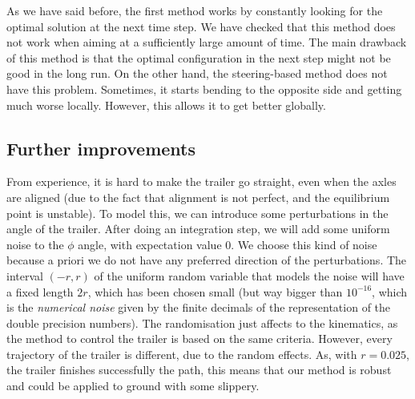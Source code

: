 
As we have said before, the first method works by constantly looking for the optimal solution at the next time step. We have checked that this method does not work when aiming at a sufficiently large amount of time. The main drawback of this method is that the optimal configuration in the next step might not be good in the long run. On the other hand, the steering-based method does not have this problem. Sometimes, it starts bending to the opposite side and getting much worse locally. However, this allows it to get better globally.



\subsection{Further improvements}

From experience, it is hard to make the trailer go straight, even when the axles are aligned (due to the fact that alignment is not perfect, and the equilibrium point is unstable). To model this, we can introduce some perturbations in the angle of the trailer. After doing an integration step, we will add some uniform noise to the $\phi$ angle, with expectation value $0$. We choose this kind of noise because a priori we do not have any preferred direction of the perturbations. The interval $(-r, r)$ of the uniform random variable that models the noise will have a fixed length $2r$, which has been chosen small (but way bigger than $10^{-16}$, which is the \textit{numerical noise} given by the finite decimals of the representation of the double precision numbers). The randomisation just affects to the kinematics, as the method to control the trailer is based on the same criteria. However, every trajectory of the trailer is different, due to the random effects. As, with $r = 0.025$, the trailer finishes successfully the path, this means that our method is robust and could be applied to ground with some slippery.\\

